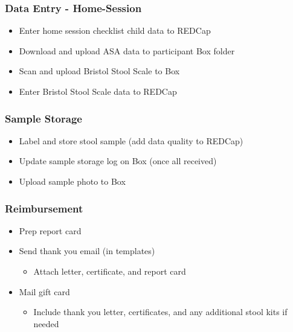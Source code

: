 \documentclass[]{book}
\providecommand{\tightlist}{%
  \setlength{\itemsep}{0pt}\setlength{\parskip}{0pt}}
\begin{document}
\hypertarget{data-entry---home-session}{%
\subsubsection{Data Entry - Home-Session}\label{data-entry---home-session}}

\begin{itemize}
\tightlist
\item
  Enter home session checklist child data to REDCap
\item
  Download and upload ASA data to participant Box folder
\item
  Scan and upload Bristol Stool Scale to Box
\item
  Enter Bristol Stool Scale data to REDCap
\end{itemize}

\hypertarget{sample-storage-1}{%
\subsubsection{Sample Storage}\label{sample-storage-1}}

\begin{itemize}
\tightlist
\item
  Label and store stool sample (add data quality to REDCap)
\item
  Update sample storage log on Box (once all received)
\item
  Upload sample photo to Box
\end{itemize}

\hypertarget{reimbursement}{%
\subsubsection{Reimbursement}\label{reimbursement}}

\begin{itemize}
\tightlist
\item
  Prep report card
\item
  Send thank you email (in templates)

  \begin{itemize}
  \tightlist
  \item
    Attach letter, certificate, and report card
  \end{itemize}
\item
  Mail gift card

  \begin{itemize}
  \tightlist
  \item
    Include thank you letter, certificates, and any additional stool kits if needed
  \end{itemize}
\end{itemize}
\end{document}
